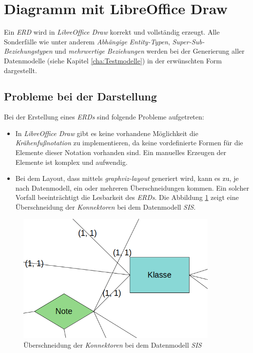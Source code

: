 \section{Diagramm mit LibreOffice Draw}
\hon{}

Ein \textit{ERD} wird in \textit{LibreOffice Draw} korrekt und vollständig erzeugt. Alle Sonderfälle wie unter anderem \textit{Abhängige Entity-Typen}, \textit{Super-Sub-Beziehungstypen} und \textit{mehrwertige Beziehungen} werden bei der Generierung aller Datenmodelle (siehe Kapitel \ref{cha:Testmodelle}) in der erwünschten Form dargestellt.

\subsection{Probleme bei der Darstellung}

Bei der Erstellung eines \textit{ERDs} sind folgende Probleme aufgetreten:
\begin{itemize}
	\item In \textit{LibreOffice Draw} gibt es keine vorhandene Möglichkeit die \textit{Krähenfußnotation} zu implementieren, da keine vordefinierte Formen für die Elemente dieser Notation vorhanden sind. Ein manuelles Erzeugen der Elemente ist komplex und aufwendig.
	\item Bei dem Layout, dass mittels \textit{graphviz-layout} generiert wird, kann es zu, je nach Datenmodell, ein oder mehreren Überschneidungen kommen. Ein solcher Vorfall beeinträchtigt die Lesbarkeit des \textit{ERDs}.
	Die Abbildung \ref{überschneidung} zeigt eine Überschneidung der \textit{Konnektoren} bei dem Datenmodell \textit{SIS}.
\end{itemize}
\noindent
\begin{figure}[H]
	\begin{center}
		\includegraphics[width=10cm]{images/19.png}
		\caption{Überschneidung der \textit{Konnektoren} bei dem Datenmodell \textit{SIS}}
		\label{überschneidung}
	\end{center}
\end{figure}

